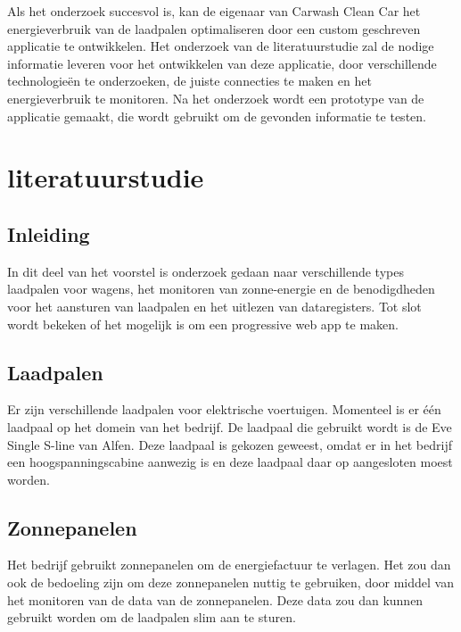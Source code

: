 Als het onderzoek succesvol is, kan de eigenaar van Carwash Clean Car het energieverbruik van de laadpalen optimaliseren door een custom geschreven applicatie te ontwikkelen. Het onderzoek van de literatuurstudie zal de nodige informatie leveren voor het ontwikkelen van deze applicatie, door verschillende technologieën te onderzoeken, de juiste connecties te maken en het energieverbruik te monitoren. Na het onderzoek wordt een prototype van de applicatie gemaakt, die wordt gebruikt om de gevonden informatie te testen.


\section{literatuurstudie}%
\label{sec:literatuurstudie}

\subsection{Inleiding}%
\label{sub:inleiding_literatuurstudie}
In dit deel van het voorstel is onderzoek gedaan naar verschillende types laadpalen voor wagens, het monitoren van zonne-energie en de benodigdheden voor het aansturen van laadpalen en het uitlezen van dataregisters. Tot slot wordt bekeken of het mogelijk is om een progressive web app te maken.

\subsection{Laadpalen}%
\label{sub:laadpalen}
Er zijn verschillende laadpalen voor elektrische voertuigen. Momenteel is er één laadpaal op het domein van het bedrijf. De laadpaal die gebruikt wordt is de Eve Single S-line van Alfen. Deze laadpaal is gekozen geweest, omdat er in het bedrijf een hoogspanningscabine aanwezig is en deze laadpaal daar op aangesloten moest worden.

\subsection{Zonnepanelen}%
\label{sub:zonnepanelen}
Het bedrijf gebruikt zonnepanelen om de energiefactuur te verlagen. Het zou dan ook de bedoeling zijn om deze zonnepanelen nuttig te gebruiken, door middel van het monitoren van de data van de zonnepanelen. Deze data zou dan kunnen gebruikt worden om de laadpalen slim aan te sturen.

